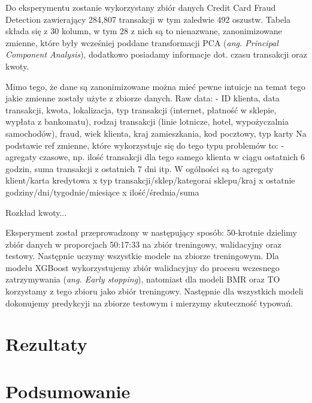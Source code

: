 \documentclass{book}
\begin{document}
Do eksperymentu zostanie wykorzystany zbiór danych Credit Card Fraud Detection zawierający 284,807 transakcji w tym zaledwie 492 oszustw. Tabela składa się z 30 kolumn, w tym 28 z nich są to nienazwane, zanonimizowane zmienne, które były wcześniej poddane transformacji PCA (\textit{ang. Principal Component Analysis}), dodatkowo posiadamy informacje dot. czasu transakcji oraz kwoty. 

Mimo tego, że dane są zanonimizowane można mieć pewne intuicje na temat tego jakie zmienne zostały użyte z zbiorze danych. 
Raw data:
- ID klienta, data transakcji, kwota, lokalizacja, typ transakcji (internet, płatność w sklepie, wypłata z bankomatu), rodzaj transakcji (linie lotnicze, hotel, wypożyczalnia samochodów), fraud, wiek klienta, kraj zamieszkania, kod pocztowy, typ karty
Na podstawie ref zmienne, które wykorzystuje się do tego typu problemów to:
- agregaty czasowe, np. ilość transakcji dla tego samego klienta w ciągu ostatnich 6 godzin, suma transakcji z ostatnich 7 dni itp.
W ogólności są to agregaty klient/karta kredytowa x typ transakcji/sklep/kategorai sklepu/kraj x ostatnie godziny/dni/tygodnie/miesiące x ilość/średnia/suma


Rozkład kwoty...

Eksperyment został przeprowadzony w następujący sposób:
50-krotnie dzielimy zbiór danych w proporcjach 50:17:33 na zbiór treningowy, walidacyjny oraz testowy. Następnie uczymy wszystkie modele na zbiorze treningowym. Dla modelu XGBoost wykorzystujemy zbiór walidacyjny do procesu wczesnego zatrzymywania (\textit{ang. Early stopping}), natomiast dla modeli BMR oraz TO korzystamy z tego zbioru jako zbiór treningowy. Następnie dla wszystkich modeli dokonujemy predykcyji na zbiorze testowym i mierzymy skuteczność typowań.

\chapter{Rezultaty}

\chapter{Podsumowanie}


\end{document}
